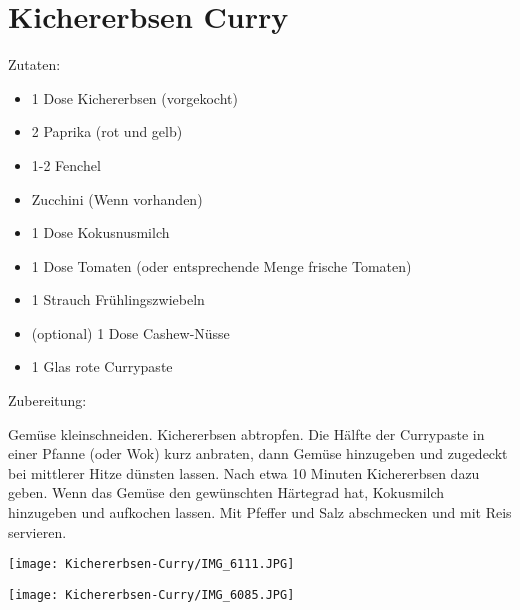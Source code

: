 \section{Kichererbsen Curry}
Zutaten:
\begin{itemize}
    \item 1 Dose Kichererbsen (vorgekocht)
    \item 2 Paprika (rot und gelb)
    \item 1-2 Fenchel
    \item Zucchini (Wenn vorhanden)
    \item 1 Dose Kokusnusmilch
    \item 1 Dose Tomaten (oder entsprechende Menge frische Tomaten)
    \item 1 Strauch Frühlingszwiebeln
    \item (optional) 1 Dose Cashew-Nüsse
    \item 1 Glas rote Currypaste
\end{itemize}

\vspace{1cm}

\noindent Zubereitung:

\noindent Gemüse kleinschneiden. Kichererbsen abtropfen. Die Hälfte der
Currypaste in einer Pfanne (oder Wok) kurz anbraten, dann Gemüse hinzugeben und
zugedeckt bei mittlerer Hitze dünsten lassen. Nach etwa 10 Minuten Kichererbsen
dazu geben. Wenn das Gemüse den gewünschten Härtegrad hat, Kokusmilch
hinzugeben und aufkochen lassen. Mit Pfeffer und Salz abschmecken und mit Reis
servieren.

\newpage
\mbox{}
\vfill
\begin{center}
    \texttt{[image: Kichererbsen-Curry/IMG\_6111.JPG]}
\end{center}
\vfill
\begin{center}
    \texttt{[image: Kichererbsen-Curry/IMG\_6085.JPG]}
\end{center}
\vfill
\mbox{ }
\newpage
